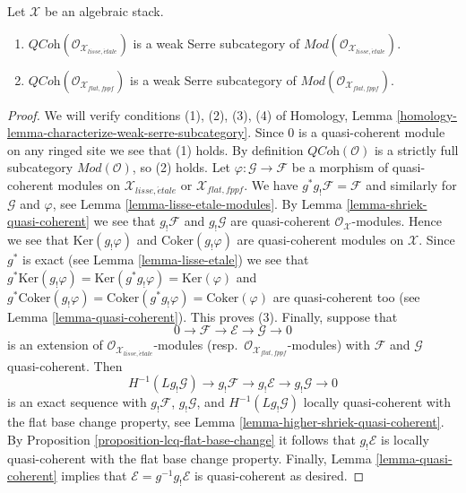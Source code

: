 \begin{lemma}
\label{lemma-quasi-coherent-weak-serre}
Let $\mathcal{X}$ be an algebraic stack.
\begin{enumerate}
\item $\textit{QCoh}(\mathcal{O}_{\mathcal{X}_{lisse,\acute{e}tale}})$
is a weak Serre subcategory of
$\textit{Mod}(\mathcal{O}_{\mathcal{X}_{lisse,\acute{e}tale}})$.
\item $\textit{QCoh}(\mathcal{O}_{\mathcal{X}_{flat,fppf}})$
is a weak Serre subcategory of
$\textit{Mod}(\mathcal{O}_{\mathcal{X}_{flat,fppf}})$.
\end{enumerate}
\end{lemma}

\begin{proof}
We will verify conditions (1), (2), (3), (4) of
Homology, Lemma \ref{homology-lemma-characterize-weak-serre-subcategory}.
Since $0$ is a quasi-coherent module on any ringed site we see that (1)
holds. By definition $\textit{QCoh}(\mathcal{O})$
is a strictly full subcategory $\textit{Mod}(\mathcal{O})$, so (2) holds.
Let $\varphi : \mathcal{G} \to \mathcal{F}$ be a morphism of quasi-coherent
modules on $\mathcal{X}_{lisse,\acute{e}tale}$ or $\mathcal{X}_{flat,fppf}$.
We have $g^*g_!\mathcal{F} = \mathcal{F}$ and similarly for
$\mathcal{G}$ and $\varphi$, see Lemma \ref{lemma-lisse-etale-modules}.
By Lemma \ref{lemma-shriek-quasi-coherent}
we see that $g_!\mathcal{F}$ and $g_!\mathcal{G}$ are quasi-coherent
$\mathcal{O}_\mathcal{X}$-modules. Hence we see that
$\text{Ker}(g_!\varphi)$ and $\text{Coker}(g_!\varphi)$ are quasi-coherent
modules on $\mathcal{X}$. Since $g^*$ is exact (see
Lemma \ref{lemma-lisse-etale}) we see that
$g^*\text{Ker}(g_!\varphi) = \text{Ker}(g^*g_!\varphi) = \text{Ker}(\varphi)$
and
$g^*\text{Coker}(g_!\varphi) = \text{Coker}(g^*g_!\varphi) =
\text{Coker}(\varphi)$
are quasi-coherent too (see Lemma \ref{lemma-quasi-coherent}).
This proves (3). Finally, suppose that
$$
0 \to \mathcal{F} \to \mathcal{E} \to \mathcal{G} \to 0
$$
is an extension of $\mathcal{O}_{\mathcal{X}_{lisse,\acute{e}tale}}$-modules
(resp.\ $\mathcal{O}_{\mathcal{X}_{flat,fppf}}$-modules) with $\mathcal{F}$
and $\mathcal{G}$ quasi-coherent. Then
$$
H^{-1}(Lg_!\mathcal{G}) \to
g_!\mathcal{F} \to
g_!\mathcal{E} \to
g_!\mathcal{G} \to 0
$$
is an exact sequence with $g_!\mathcal{F}$, $g_!\mathcal{G}$, and
$H^{-1}(Lg_!\mathcal{G})$ locally quasi-coherent
with the flat base change property, see
Lemma \ref{lemma-higher-shriek-quasi-coherent}.
By Proposition \ref{proposition-lcq-flat-base-change}
it follows that $g_!\mathcal{E}$ is locally quasi-coherent with the
flat base change property. Finally, Lemma \ref{lemma-quasi-coherent}
implies that $\mathcal{E} = g^{-1}g_!\mathcal{E}$ is quasi-coherent
as desired.
\end{proof}






